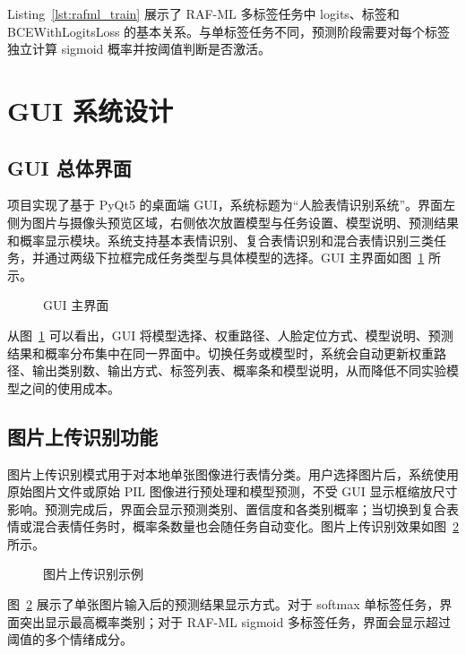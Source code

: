 \documentclass[UTF8,a4paper,12pt]{ctexart}
\newcommand{\figplaceholder}[1]{%
  \begin{center}
    \fbox{\parbox{0.78\textwidth}{\centering #1}}
  \end{center}
}
\begin{document}
Listing~\ref{lst:rafml_train} 展示了 RAF-ML 多标签任务中 logits、标签和 BCEWithLogitsLoss 的基本关系。与单标签任务不同，预测阶段需要对每个标签独立计算 sigmoid 概率并按阈值判断是否激活。

\section{GUI 系统设计}

\subsection{GUI 总体界面}

项目实现了基于 PyQt5 的桌面端 GUI，系统标题为“人脸表情识别系统”。界面左侧为图片与摄像头预览区域，右侧依次放置模型与任务设置、模型说明、预测结果和概率显示模块。系统支持基本表情识别、复合表情识别和混合表情识别三类任务，并通过两级下拉框完成任务类型与具体模型的选择。GUI 主界面如图~\ref{fig:gui_main} 所示。

\begin{figure}[H]
  \centering
  \figplaceholder{\rule{0pt}{1.2em}}
  \caption{GUI 主界面}
  \label{fig:gui_main}
\end{figure}

从图~\ref{fig:gui_main} 可以看出，GUI 将模型选择、权重路径、人脸定位方式、模型说明、预测结果和概率分布集中在同一界面中。切换任务或模型时，系统会自动更新权重路径、输出类别数、输出方式、标签列表、概率条和模型说明，从而降低不同实验模型之间的使用成本。

\subsection{图片上传识别功能}

图片上传识别模式用于对本地单张图像进行表情分类。用户选择图片后，系统使用原始图片文件或原始 PIL 图像进行预处理和模型预测，不受 GUI 显示框缩放尺寸影响。预测完成后，界面会显示预测类别、置信度和各类别概率；当切换到复合表情或混合表情任务时，概率条数量也会随任务自动变化。图片上传识别效果如图~\ref{fig:gui_image_prediction} 所示。

\begin{figure}[H]
  \centering
  \figplaceholder{\rule{0pt}{1.2em}}
  \caption{图片上传识别示例}
  \label{fig:gui_image_prediction}
\end{figure}

图~\ref{fig:gui_image_prediction} 展示了单张图片输入后的预测结果显示方式。对于 softmax 单标签任务，界面突出显示最高概率类别；对于 RAF-ML sigmoid 多标签任务，界面会显示超过阈值的多个情绪成分。
\end{document}
